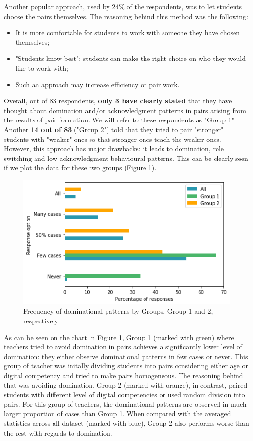 \documentclass[conference]{IEEEtran}
\begin{document}
Another popular approach, used by 24\% of the respondents, was to let students choose the pairs themselves. The reasoning behind this method was the following:
\begin{itemize}
    \item It is more comfortable for students to work with someone they have chosen themselves;
    \item "Students know best": students can make the right choice on who they would like to work with;
    \item Such an approach may increase efficiency or pair work.
\end{itemize}

Overall, out of 83 respondents, \textbf{only 3 have clearly stated} that they have thought about domination and/or acknowledgment patterns in pairs arising from the results of pair formation. We will refer to these respondents as "Group 1". Another \textbf{14 out of 83} ("Group 2") told that they tried to pair "stronger" students with "weaker" ones so that stronger ones teach the weaker ones. However, this approach has major drawbacks: it leads to domination, role switching and low acknowledgment behavioural patterns. This can be clearly seen if we plot the data for these two groups (Figure \ref{fig:dominationCompare}).

\begin{figure}[h]
\includegraphics[scale=0.5]{images/domination-comparison.png}
\caption{Frequency of dominational patterns by Groups, Group 1 and 2, respectively}
\label{fig:dominationCompare}
\end{figure}

As can be seen on the chart in Figure \ref{fig:dominationCompare}, Group 1 (marked with green) where teachers tried to avoid domination in pairs achieves a significantly lower level of domination: they either observe dominational patterns in few cases or never. This group of teacher was initally dividing students into pairs considering either age or digital competency and tried to make pairs homogeneous. The reasoning behind that was avoiding domination. Group 2 (marked with orange), in contrast, paired students with different level of digital competencies or used random division into pairs. For this group of teachers, the dominational patterns are observed in much larger proportion of cases than Group 1. When compared with the averaged statistics across all dataset (marked with blue), Group 2 also performs worse than the rest with regards to domination. 
\end{document}
